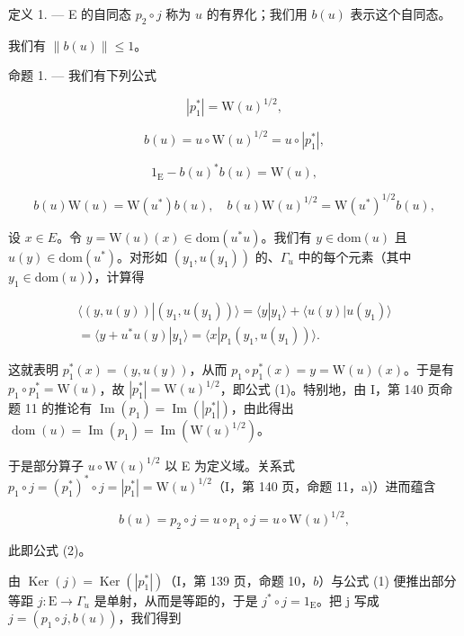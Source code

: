 定义 1. --- E 的自同态 \(p_2 \circ j\) 称为 \(u\) 的有界化；我们用 \(b(u)\) 表示这个自同态。

我们有 \(\|b(u)\|\leqslant1\)。

命题 1. --- 我们有下列公式

\[
| p _ {1} ^ {*} | = \mathrm{W} (u) ^ {1 / 2},\tag{1}
\]

\[
b (u) = u \circ \mathrm{W} (u) ^ {1 / 2} = u \circ | p _ {1} ^ {*} |,\tag{2}
\]

\[
1 _ {\mathrm{E}} - b (u) ^ {*} b (u) = \mathrm{W} (u),\tag{3}
\]

\[
b (u) \mathrm{W} (u) = \mathrm{W} (u ^ {*}) b (u), \quad b (u) \mathrm{W} (u) ^ {1 / 2} = \mathrm{W} (u ^ {*}) ^ {1 / 2} b (u),\tag{4}
\]

设 \(x \in E\)。令 \(y = \mathrm{W}(u)(x) \in \mathrm{dom}(u^{*}u)\)。我们有 \(y \in \mathrm{dom}(u)\) 且 \(u(y) \in \mathrm{dom}(u^{*})\)。对形如 \((y_{1}, u(y_{1}))\) 的、\(\Gamma_{u}\) 中的每个元素（其中 \(y_{1} \in \mathrm{dom}(u)\)），计算得

\[
\begin{array}{c} \langle (y, u (y)) | (y _ {1}, u (y _ {1})) \rangle = \langle y | y _ {1} \rangle + \langle u (y) | u (y _ {1}) \rangle \\ = \langle y + u ^ {*} u (y) | y _ {1} \rangle = \langle x | p _ {1} (y _ {1}, u (y _ {1})) \rangle . \end{array}
\]

这就表明 \(p_{1}^{*}(x) = (y, u(y))\)，从而 \(p_{1} \circ p_{1}^{*}(x) = y = \mathrm{W}(u)(x)\)。于是有 \(p_{1} \circ p_{1}^{*} = \mathrm{W}(u)\)，故 \(|p_{1}^{*}| = \mathrm{W}(u)^{1/2}\)，即公式 (1)。特别地，由 I，第 140 页命题 11 的推论有 \(\operatorname{Im}(p_{1}) = \operatorname{Im}(|p_{1}^{*}|)\)，由此得出 \(\operatorname{dom}(u) = \operatorname{Im}(p_{1}) = \operatorname{Im}(\mathrm{W}(u)^{1/2})\)。

于是部分算子 \(u \circ \mathrm{W}(u)^{1/2}\) 以 E 为定义域。关系式 \(p_1 \circ j = (p_1^*)^* \circ j = |p_1^*| = \mathrm{W}(u)^{1/2}\)（I，第 140 页，命题 11，a)）进而蕴含

\[
b (u) = p _ {2} \circ j = u \circ p _ {1} \circ j = u \circ \mathrm{W} (u) ^ {1 / 2},
\]

此即公式 (2)。

由 \(\operatorname{Ker}(j) = \operatorname{Ker}(|p_1^*|)\)（I，第 139 页，命题 10，\(b\)）与公式 (1) 便推出部分等距 \(j: \mathrm{E} \to \Gamma_u\) 是单射，从而是等距的，于是 \(j^* \circ j = 1_{\mathrm{E}}\)。把 j 写成 \(j = (p_1 \circ j, b(u))\)，我们得到

